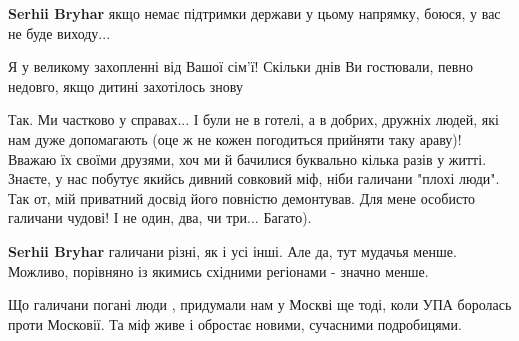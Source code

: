 \begin{itemize}
\begin{itemize}
 
\textbf{Serhii Bryhar} якщо немає підтримки держави у цьому напрямку, боюся, у вас не буде виходу...
\end{itemize}

 
Я у великому захопленні від Вашої сім'ї! Скільки днів Ви гостювали, певно
недовго, якщо дитині захотілось знову

\begin{itemize}
 

Так. Ми частково у справах... І були не в готелі, а в добрих, дружніх людей,
які нам дуже допомагають (оце ж не кожен погодиться прийняти таку араву)!
Вважаю їх своїми друзями, хоч ми й бачилися буквально кілька разів у житті.
Знаєте, у нас побутує якийсь дивний совковий міф, ніби галичани "плохі люди".
Так от, мій приватний досвід його повністю демонтував. Для мене особисто
галичани чудові! І не один, два, чи три... Багато).


 
\textbf{Serhii Bryhar} галичани різні, як і усі інші. Але да, тут мудачья
менше. Можливо, порівняно із якимись східними регіонами - значно менше.

 

Що галичани погані люди , придумали нам у Москві ще тоді, коли УПА боролась
проти Московії. Та міф живе і обростає новими, сучасними подробицями. 


\end{itemize}
\end{itemize}
